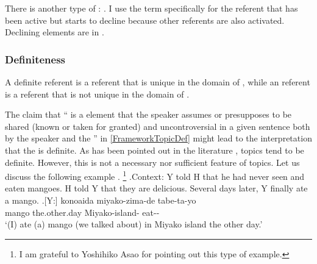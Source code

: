 There is another type of : .
I use the term  specifically for the referent that has been active but starts to decline because other referents are also activated.
Declining elements are in .

\subsubsection{Definiteness}\label{Fr:Definition:TFFeathers:Definite}

A definite referent is a referent
that is unique in the domain of ,
while an  referent is a referent
that is not unique in the domain of .

The claim that `` is a  element that the speaker assumes or presupposes to be shared (known or taken for granted) and uncontroversial in a given sentence both by the speaker and the '' in \ref{FrameworkTopicDef} 
might lead to the interpretation that the  is definite.
As has been pointed out in the literature \cite{givon76,keenan76,comrie79,comrie83},
topics tend to be definite.
However, this is not a necessary nor sufficient feature of topics.
Let us discuss the following example \Next.%
	\footnote{
	I am grateful to Yoshihiko Asao
	for pointing out this type of example.
	}
\ex.\label{Fr:Definition:TFFeathers:Definite:Ex:Mango1}Context:
	Y told H that he had never seen and eaten mangoes.
	H told Y that they are delicious.
	Several days later, Y finally ate a mango.
	\ag.[Y:]  konoaida miyako-zima-de tabe-ta-yo \\
			mango the.other.day Miyako-island- eat-- \\
			`(I) ate (a) mango (we talked about) in Miyako island the other day.'

